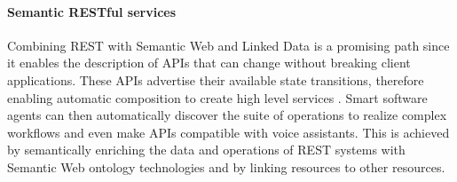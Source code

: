 

\paragraph{Semantic RESTful services}
Combining REST with Semantic Web and Linked Data is a promising path since it enables the description of APIs that can change without breaking client applications. These APIs advertise their available state transitions, therefore enabling automatic composition to create high level services \cite{alarcon2015rest}. Smart software agents can then automatically discover the suite of operations to realize complex workflows and even make APIs compatible with voice assistants. This is achieved by semantically enriching the data and operations of REST systems with Semantic Web ontology technologies and by linking resources to other resources.



